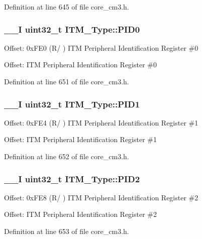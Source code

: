 Definition at line 645 of file core\-\_\-cm3.\-h.

\hypertarget{struct_i_t_m___type_ab69ade751350a7758affdfe396517535}{
\subsubsection[{P\-I\-D0}]{\setlength{\rightskip}{0pt plus 5cm}\-\_\-\-\_\-\-I {\bf uint32\-\_\-t} I\-T\-M\-\_\-\-Type\-::\-P\-I\-D0}}\label{struct_i_t_m___type_ab69ade751350a7758affdfe396517535}
Offset\-: 0x\-F\-E0 (R/ ) I\-T\-M Peripheral Identification Register \#0

Offset\-: I\-T\-M Peripheral Identification Register \#0 

Definition at line 651 of file core\-\_\-cm3.\-h.

\hypertarget{struct_i_t_m___type_a30e87ec6f93ecc9fe4f135ca8b068990}{
\subsubsection[{P\-I\-D1}]{\setlength{\rightskip}{0pt plus 5cm}\-\_\-\-\_\-\-I {\bf uint32\-\_\-t} I\-T\-M\-\_\-\-Type\-::\-P\-I\-D1}}\label{struct_i_t_m___type_a30e87ec6f93ecc9fe4f135ca8b068990}
Offset\-: 0x\-F\-E4 (R/ ) I\-T\-M Peripheral Identification Register \#1

Offset\-: I\-T\-M Peripheral Identification Register \#1 

Definition at line 652 of file core\-\_\-cm3.\-h.

\hypertarget{struct_i_t_m___type_ae139d2e588bb382573ffcce3625a88cd}{
\subsubsection[{P\-I\-D2}]{\setlength{\rightskip}{0pt plus 5cm}\-\_\-\-\_\-\-I {\bf uint32\-\_\-t} I\-T\-M\-\_\-\-Type\-::\-P\-I\-D2}}\label{struct_i_t_m___type_ae139d2e588bb382573ffcce3625a88cd}
Offset\-: 0x\-F\-E8 (R/ ) I\-T\-M Peripheral Identification Register \#2

Offset\-: I\-T\-M Peripheral Identification Register \#2 

Definition at line 653 of file core\-\_\-cm3.\-h.

